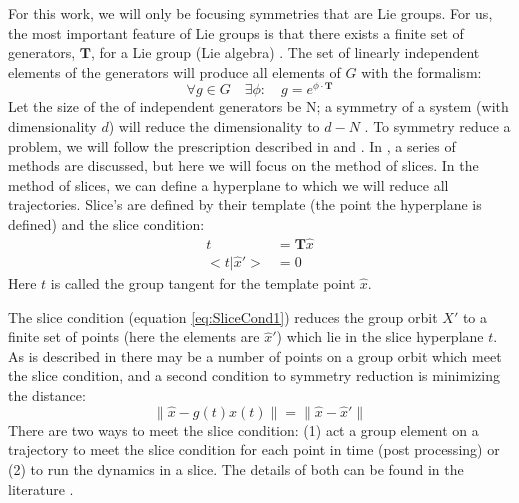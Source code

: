 \documentclass[12 pt]{article}
\begin{document}
For this work, we will only be focusing symmetries that are Lie groups.  For us, the most important feature of Lie groups is that there exists a finite set of generators, $\mathbf{T}$, for a Lie group (Lie algebra) \cite{CB}.  The set of linearly independent elements of the generators will produce all elements of $G$ with the formalism:
\begin{equation}
\forall g \in G \quad \exists \phi: \quad  g = e^{\phi \cdot \mathbf{T}}
\label{eq:SymmGen}
\end{equation}
Let the size of the of independent generators be N; a symmetry of a system (with dimensionality $d$) will reduce the dimensionality to $d-N$ \cite{Atl}.
To symmetry reduce a problem, we will follow the prescription described in \cite{SliceCond} and \cite{Atl}.  In \cite{Atl}, a series of methods are discussed, but here we will focus on the method of slices.  In the method of slices, we can define a hyperplane to which we will reduce all trajectories. Slice's are defined by their template (the point the hyperplane is defined) and the slice condition:
\begin{equation}
\begin{split}
t &= \mathbf{T}  \hat{x} \\
<t|\hat{x}'> &= 0
\label{eq:SliceCond1}
\end{split}
\end{equation}
Here $t$ is called the group tangent for the template point $\hat{x}$.

The slice condition (equation \ref{eq:SliceCond1}) reduces the group orbit ${X'}$ to a finite set of points (here the elements are ${\hat{x}'}$) which lie in the slice hyperplane $t$.  As is described in \cite{SliceCond} there may be a number of points on a group orbit which meet the slice condition, and a second condition to symmetry reduction is minimizing the distance:
\begin{equation}
\parallel \hat{x}-g(t)x(t) \parallel = \parallel \hat{x}-\hat{x}' \parallel
\label{eq:SliceCond2}
\end{equation}
There are two ways to meet the slice condition: (1) act a group element on a trajectory to meet the slice condition for each point in time (post processing) or (2) to run the dynamics in a slice.  The details of both can be found in the literature \cite{CB,Eth, SliceCond, Atl}.
\end{document}
